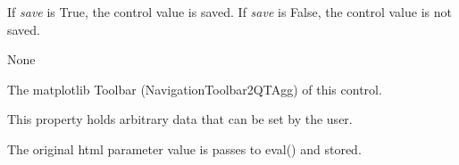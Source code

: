 \documentclass[letterpaper,10pt,english]{sphinxmanual}
\begin{document}
\begin{fulllineitems}
\begin{fulllineitems}
If \emph{save} is True, the control value is saved.
If \emph{save} is False, the control value is not saved.

\end{fulllineitems}


\begin{fulllineitems}
\label{api:mpl.Canvas.scroll_action}
None

\end{fulllineitems}


\begin{fulllineitems}
\label{api:mpl.Canvas.toolbar}
The matplotlib Toolbar (NavigationToolbar2QTAgg) of this control.

\end{fulllineitems}


\begin{fulllineitems}
\label{api:mpl.Canvas.user}
This property holds arbitrary data that can be set by the user.

The original html parameter value is passes to eval() and stored.

\end{fulllineitems}


\end{fulllineitems}

\end{document}
